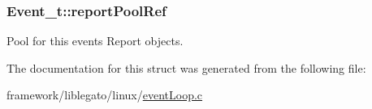 \subsubsection[{\texorpdfstring{report\+Pool\+Ref}{reportPoolRef}}]{ Event\+\_\+t\+::report\+Pool\+Ref}\hypertarget{struct_event__t_a40bab5d184f25b39691053b445966c16}{}\label{struct_event__t_a40bab5d184f25b39691053b445966c16}


Pool for this event\textquotesingle{}s Report objects. 



The documentation for this struct was generated from the following file\+:\begin{DoxyCompactItemize}
\item 
framework/liblegato/linux/\hyperlink{event_loop_8c}{event\+Loop.\+c}\end{DoxyCompactItemize}
